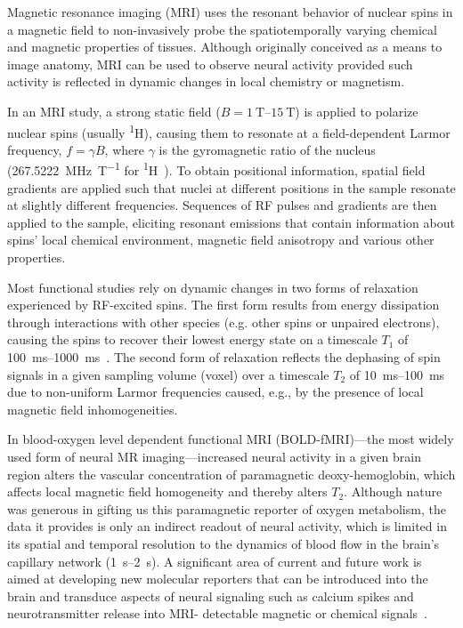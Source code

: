 Magnetic resonance imaging (MRI) uses the resonant behavior of nuclear spins in a magnetic field to non-invasively probe the spatiotemporally varying chemical and magnetic properties of tissues.
Although originally conceived as a means to image anatomy, MRI can be used to observe neural activity provided such activity is reflected in dynamic changes in local chemistry or magnetism.

In an MRI study, a strong static field ($B = \SIrange{1}{15}{\tesla}$) is applied to polarize nuclear spins (usually \textsuperscript{1}H), causing them to resonate at a field-dependent Larmor frequency, $f=\gamma B$, where $\gamma$ is the gyromagnetic ratio of the nucleus (\SI{267.5222}{\mega\hertz\per\tesla} for \textsuperscript{1}H~\cite{codata10}).
To obtain positional information, spatial field gradients are applied such that nuclei at different positions in the sample resonate at slightly different frequencies.
Sequences of RF pulses and gradients are then applied to the sample, eliciting resonant emissions that contain information about spins' local chemical environment, magnetic field anisotropy and various other properties.

Most functional studies rely on dynamic changes in two forms of relaxation experienced by RF-excited spins.
The first form results from energy dissipation through interactions with other species (e.g. other spins or unpaired electrons), causing the spins to recover their lowest energy state on a timescale $T_1$ of \SIrange{100}{1000}{\milli\second}~\cite{rooney07}.
The second form of relaxation reflects the dephasing of spin signals in a given sampling volume (voxel) over a timescale $T_2$ of \SIrange{10}{100}{\milli\second}~\cite{deichmann95} due to non-uniform Larmor frequencies caused, e.g., by the presence of local magnetic field inhomogeneities.

In blood-oxygen level dependent functional MRI (BOLD-fMRI)---the most widely used form of neural MR imaging---increased neural activity in a given brain region alters the vascular concentration of paramagnetic deoxy-hemoglobin, which affects local magnetic field homogeneity and thereby alters $T_2$.
Although nature was generous in gifting us this paramagnetic reporter of oxygen metabolism, the data it provides is only an indirect readout of neural activity, which is limited in its spatial and temporal resolution to the dynamics of blood flow in the brain's capillary network (\SIrange{1}{2}{\second}).
A significant area of current and future work is aimed at developing new molecular reporters that can be introduced into the brain and transduce aspects of neural signaling such as calcium spikes and neurotransmitter release into MRI- detectable magnetic or chemical signals~\cite{shapiro10,koretsky12,hsieh12}.

